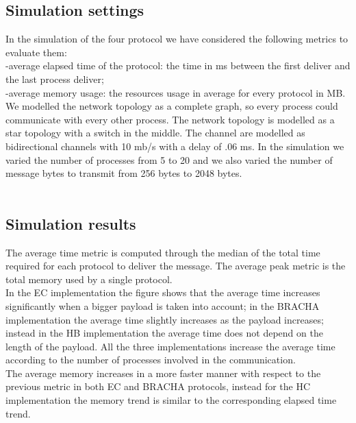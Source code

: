 \documentclass[12pt]{article}
\begin{document}
\subsection{Simulation settings}
In the simulation of the four protocol we have considered the following metrics to evaluate them:\\
-average elapsed time of the protocol: the time in ms between the first deliver and the last process deliver;\\
-average memory usage: the resources usage in average for every protocol in MB.\\ 
We modelled the network topology as a complete graph, so every process could communicate with every other process. The network topology is modelled as a star topology with a switch in the middle.
The channel are modelled as bidirectional channels with 10 mb/s with a delay of .06 ms.
In the simulation we varied the number of processes from 5 to 20 and we also varied the number of message bytes to transmit from 256 bytes to 2048 bytes.\\
\\
\subsection{Simulation results}
The average time metric is computed through the median of the total time required for each protocol to deliver the message. The average peak metric is the total memory used by a single protocol.\\
In the EC implementation the figure shows that the average time increases significantly when a bigger payload is taken into account; in the BRACHA implementation the average time slightly increases as the payload increases; instead in the HB implementation the average time does not depend on the length of the payload. All the three implementations increase the average time according to the number of processes involved in the communication.\\
The average memory increases in a more faster manner with respect to the previous metric in both EC and BRACHA protocols, instead for the HC implementation the memory trend is similar to the corresponding elapsed time trend.\\
\\
\end{document}
